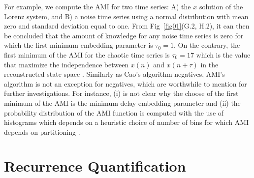 \documentclass[fleqn,10pt]{wlscirep}
\begin{document}
For example, we compute the AMI for two time series:
A) the $x$ solution of the Lorenz system, and
B) a noise time series using a normal distribution with mean zero and 
standard deviation equal to one. From Fig~\ref{fig01}(G.2, H.2), it can then be
concluded that the amount of knowledge for any noise time series is zero 
for which the first minimum embedding parameter is $\tau_0=1$. 
On the contrary, the first minimum of the AMI for the chaotic time series 
is $\tau_0=17$ which is the value that maximize the independence 
between $x(n)$ and $x(n+\tau)$ in the reconstructed state space 
\cite{bradley2015}.
Similarly as Cao's algorithm negatives, AMI's algorithm is not an
exception for negatives, which are worthwhile to mention for further 
investigations.
For instance, (i) is not clear why the choose of the first minimum of the AMI 
is the minimum delay embedding parameter \cite{kantz2003} and 
(ii) the probability distribution of the AMI function is computed
with the use of histograms which depends on a heuristic choice of number of bins
for which AMI depends on partitioning \cite{garcia2005e71}.



\section*{Recurrence Quantification}\label{sec:recurrence-quantification}
\end{document}
